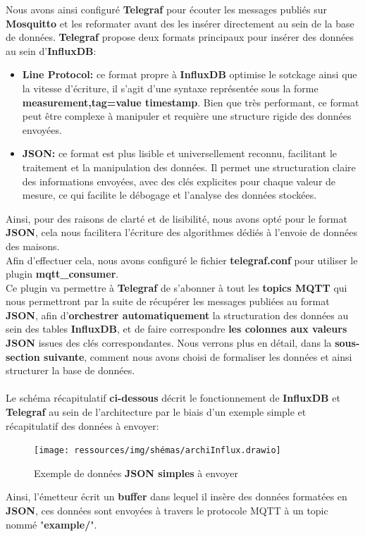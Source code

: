 \documentclass[10pt, a4paper]{report}
\begin{document}
	Nous avons ainsi configuré \textbf{Telegraf} pour écouter les messages publiés sur \textbf{Mosquitto} et les reformater avant des les insérer directement au sein de la base de données.\newpage
	\textbf{Telegraf} propose deux formats principaux pour insérer des données au sein d'\textbf{InfluxDB}:
	\begin{itemize}
		\item \textbf{Line Protocol:} ce format propre à \textbf{InfluxDB} optimise le sotckage ainsi que la vitesse d'écriture, il s'agit d'une syntaxe représentée sous la forme \textbf{measurement,tag=value timestamp}. Bien que très performant, ce format peut être complexe à manipuler et requière une structure rigide des données envoyées.
		
		\item \textbf{JSON:} ce format est plus lisible et universellement reconnu, facilitant le traitement et la manipulation des données. Il permet une structuration claire des informations envoyées, avec des clés explicites pour chaque valeur de mesure, ce qui facilite le débogage et l’analyse des données stockées.
	\end{itemize}
	Ainsi, pour des raisons de clarté et de lisibilité, nous avons opté pour le format \textbf{JSON}, cela nous facilitera l'écriture des algorithmes dédiés à l'envoie de données des maisons.\\
	Afin d'effectuer cela, nous avons configuré le fichier \textbf{telegraf.conf} pour utiliser le plugin \textbf{mqtt\_consumer}.\\
	Ce plugin va permettre à \textbf{Telegraf} de s'abonner à tout les \textbf{topics MQTT} qui nous permettront par la suite de récupérer les messages publiées au format \textbf{JSON}, afin d'\textbf{orchestrer automatiquement} la structuration des données au sein des tables \textbf{InfluxDB}, et de faire correspondre \textbf{les colonnes aux valeurs JSON} issues des clés correspondantes. Nous verrons plus en détail, dans la \textbf{sous-section suivante}, comment nous avons choisi de formaliser les données et ainsi structurer la base de données.\\\\
	Le schéma récapitulatif \textbf{ci-dessous} décrit le fonctionnement de \textbf{InfluxDB} et \textbf{Telegraf} au sein de l'architecture par le biais d'un exemple simple et récapitulatif des données à envoyer:
	
	\begin{figure}[h!]
		\centering
		\texttt{[image: ressources/img/shémas/archiInflux.drawio]}
		\caption{Exemple de données \textbf{JSON simples} à envoyer}
		\label{fig:archiInflux}
	\end{figure}
	\vspace{1cm}
	Ainsi, l'émetteur écrit un \textbf{buffer} dans lequel il insère des données formatées en \textbf{JSON}, ces données sont envoyées à travers le protocole MQTT à un topic nommé "\textbf{example/}".
	
\end{document}
